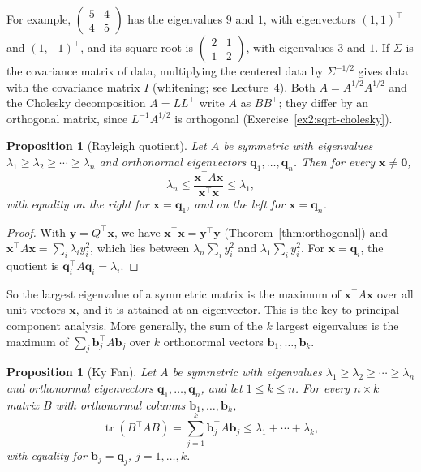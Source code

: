 \documentclass[11pt]{article}
\theoremstyle{definition}
\theoremstyle{plain}
\newtheorem{proposition}[definition]{Proposition}
\theoremstyle{remark}
\DeclareMathOperator{\tr}{tr}
\begin{document}
For example, $\begin{pmatrix} 5 & 4 \\ 4 & 5 \end{pmatrix}$ has the eigenvalues $9$ and $1$, with eigenvectors $(1, 1)^\top$ and $(1, -1)^\top$, and its square root is $\begin{pmatrix} 2 & 1 \\ 1 & 2 \end{pmatrix}$, with eigenvalues $3$ and $1$. If $\Sigma$ is the covariance matrix of data, multiplying the centered data by $\Sigma^{-1/2}$ gives data with the covariance matrix $I$ (whitening; see Lecture~4). Both $A = A^{1/2}A^{1/2}$ and the Cholesky decomposition $A = LL^\top$ write $A$ as $BB^\top$; they differ by an orthogonal matrix, since $L^{-1}A^{1/2}$ is orthogonal (Exercise~\ref{ex2:sqrt-cholesky}).

\begin{proposition}[Rayleigh quotient]\label{prop:rayleigh}
    Let $A$ be symmetric with eigenvalues $\lambda_1 \geq \lambda_2 \geq \cdots \geq \lambda_n$ and orthonormal eigenvectors $\mathbf{q}_1, \ldots, \mathbf{q}_n$. Then for every $\mathbf{x} \neq \mathbf{0}$,
    \[\lambda_n \leq \frac{\mathbf{x}^\top A \mathbf{x}}{\mathbf{x}^\top \mathbf{x}} \leq \lambda_1,\]
    with equality on the right for $\mathbf{x} = \mathbf{q}_1$, and on the left for $\mathbf{x} = \mathbf{q}_n$.
\end{proposition}

\begin{proof}
    With $\mathbf{y} = Q^\top \mathbf{x}$, we have $\mathbf{x}^\top \mathbf{x} = \mathbf{y}^\top \mathbf{y}$ (Theorem~\ref{thm:orthogonal}) and $\mathbf{x}^\top A \mathbf{x} = \sum_i \lambda_i y_i^2$, which lies between $\lambda_n \sum_i y_i^2$ and $\lambda_1 \sum_i y_i^2$. For $\mathbf{x} = \mathbf{q}_i$, the quotient is $\mathbf{q}_i^\top A \mathbf{q}_i = \lambda_i$.
\end{proof}

So the largest eigenvalue of a symmetric matrix is the maximum of $\mathbf{x}^\top A \mathbf{x}$ over all unit vectors $\mathbf{x}$, and it is attained at an eigenvector. This is the key to principal component analysis. More generally, the sum of the $k$ largest eigenvalues is the maximum of $\sum_j \mathbf{b}_j^\top A\mathbf{b}_j$ over $k$ orthonormal vectors $\mathbf{b}_1, \ldots, \mathbf{b}_k$.

\begin{proposition}[Ky Fan]\label{prop:ky-fan}
    Let $A$ be symmetric with eigenvalues $\lambda_1 \geq \lambda_2 \geq \cdots \geq \lambda_n$ and orthonormal eigenvectors $\mathbf{q}_1, \ldots, \mathbf{q}_n$, and let $1 \leq k \leq n$. For every $n \times k$ matrix $B$ with orthonormal columns $\mathbf{b}_1, \ldots, \mathbf{b}_k$,
    \[\tr(B^\top AB) = \sum_{j=1}^k \mathbf{b}_j^\top A\mathbf{b}_j \leq \lambda_1 + \cdots + \lambda_k,\]
    with equality for $\mathbf{b}_j = \mathbf{q}_j$, $j = 1, \ldots, k$.
\end{proposition}
\end{document}
